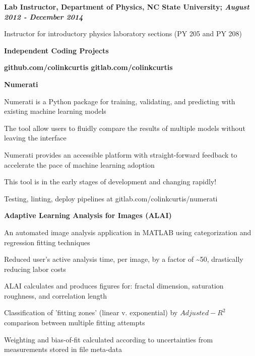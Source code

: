 \documentclass[letterpaper,final]{memoir}
\newcommand{\LargeSep}{\vspace{1.3em}}
\newcommand{\Sep}{\vspace{1.0em}}
\newcommand{\SmallSep}{\vspace{0.4em}}
\newcommand{\CVSection}[1]
	{\LARGE\textbf{#1}\par
	\SmallSep\normalsize}
\newcommand{\CVItem}[1]
	{\textbf{\color{Blue} #1}}
\newcommand\tab[1][1cm]{\hspace*{#1}}
\begin{document}
\Sep

\CVItem{Lab Instructor, Department of Physics, NC State University; \textit{August 2012 - December 2014}}
\begin{compactitem}[\color{Blue}$\circ$]

    \SmallSep
    \item Instructor for introductory physics laboratory sections (PY 205 and PY 208)
\end{compactitem}

\LargeSep

\newpage


\notoserif \CVSection{Independent Coding Projects}
\SmallSep

\normalfont
\CVItem{github.com/colinkcurtis \tab gitlab.com/colinkcurtis}
\LargeSep

\CVItem{Numerati}
\SmallSep
\begin{compactitem}[\color{Blue}$\circ$]

    \item Numerati is a Python package for training, validating, and predicting with existing machine learning models
    \SmallSep
    \item The tool allow users to fluidly compare the results of multiple models without leaving the interface
    \SmallSep
    \item Numerati provides an accessible platform with straight-forward feedback to accelerate the pace of machine learning adoption
    \SmallSep
    \item This tool is in the early stages of development and changing rapidly!
    \SmallSep
    \item Testing, linting, deploy pipelines at gitlab.com/colinkcurtis/numerati

\end{compactitem}
\Sep

\CVItem{Adaptive Learning Analysis for Images (ALAI)}
\SmallSep
\begin{compactitem}[\color{Blue}$\circ$]
    \item An automated image analysis application in MATLAB using categorization and regression fitting techniques
    \SmallSep
    \item Reduced user's active analysis time, per image, by a factor of \textasciitilde 50, drastically reducing labor costs
    \SmallSep
    \item ALAI calculates and produces figures for: fractal dimension, saturation roughness, and correlation length
    \SmallSep
    \item Classification of 'fitting zones' (linear v. exponential) by $Adjusted-R^2$ comparison between multiple fitting attempts
    \SmallSep
    \item Weighting and bias-of-fit calculated according to uncertainties from measurements stored in file meta-data
\end{compactitem}
\LargeSep
\end{document}
